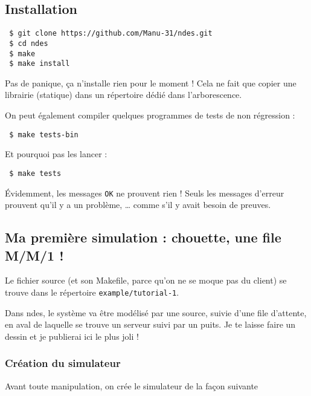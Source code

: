 \documentclass{article}
\begin{document}
\subsection{Installation}

\begin{verbatim}
 $ git clone https://github.com/Manu-31/ndes.git
 $ cd ndes
 $ make
 $ make install
\end{verbatim}

   Pas de panique, ça n'installe rien pour le moment ! Cela ne fait
que copier une librairie (statique) dans un répertoire dédié dans
l'arborescence.

   On peut également compiler quelques programmes de tests de non
régression :

\begin{verbatim}
 $ make tests-bin
\end{verbatim}
   Et pourquoi pas les lancer :

\begin{verbatim}
 $ make tests
\end{verbatim}

   Évidemment, les messages {\tt OK} ne prouvent rien ! Seuls les
messages d'erreur prouvent qu'il y a un problème, \ldots {} comme s'il
y avait besoin de preuves.

\subsection{Ma première simulation : chouette, une file M/M/1 !}

   Le fichier source (et son Makefile, parce qu'on ne se moque pas du
client) se trouve dans le répertoire {\tt example/tutorial-1}.

   Dans {\sc ndes}, le système va être modélisé par une source, suivie
d'une file d'attente, en aval de laquelle se trouve un serveur suivi
par un puits. Je te laisse faire un dessin et je publierai ici le plus
joli !

\subsubsection{Création du simulateur}

   Avant toute manipulation, on crée le simulateur de la façon suivante
\end{document}
